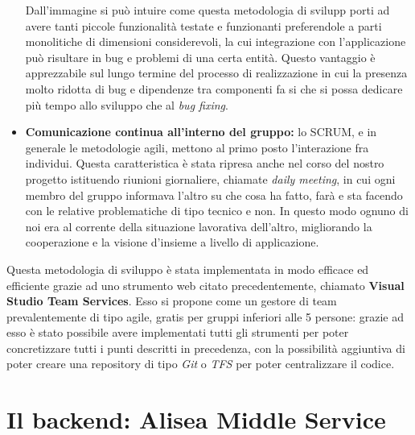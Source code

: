 \documentclass[a4]{book}
\begin{document}
\begin{itemize}
\begin{figure}[!h]
\begin{center}
		\end{center}
	\end{figure}
	
	Dall'immagine si può intuire come questa metodologia di svilupp porti ad avere tanti piccole funzionalità testate e funzionanti preferendole a parti monolitiche di dimensioni considerevoli, la cui integrazione con l'applicazione può risultare in bug e problemi di una certa entità. Questo vantaggio è apprezzabile sul lungo termine del processo di realizzazione in cui la presenza molto ridotta di bug e dipendenze tra componenti fa si che si possa dedicare più tempo allo sviluppo che al \textit{bug fixing}.
	
	\item \textbf{Comunicazione continua all'interno del gruppo:} lo SCRUM, e in generale le metodologie agili, mettono al primo posto l'interazione fra individui. Questa caratteristica è stata ripresa anche nel corso del nostro progetto istituendo riunioni giornaliere, chiamate \textit{daily meeting}, in cui ogni membro del gruppo informava l'altro su che cosa ha fatto, farà e sta facendo con le relative problematiche di tipo tecnico e non. In questo modo ognuno di noi era al corrente della situazione lavorativa dell'altro, migliorando la cooperazione e la visione d'insieme a livello di applicazione.\\
\end{itemize}

Questa metodologia di sviluppo è stata implementata in modo efficace ed efficiente grazie ad uno strumento web citato precedentemente, chiamato \textbf{Visual Studio Team Services}. Esso si propone come un gestore di team prevalentemente di tipo agile, gratis per gruppi inferiori alle 5 persone: grazie ad esso è stato possibile avere implementati tutti gli strumenti per poter concretizzare tutti i punti descritti in precedenza, con la possibilità aggiuntiva di poter creare una repository di tipo \textit{Git} o \textit{TFS} per poter centralizzare il codice.
\chapter{Il backend: Alisea Middle Service}
\end{document}
